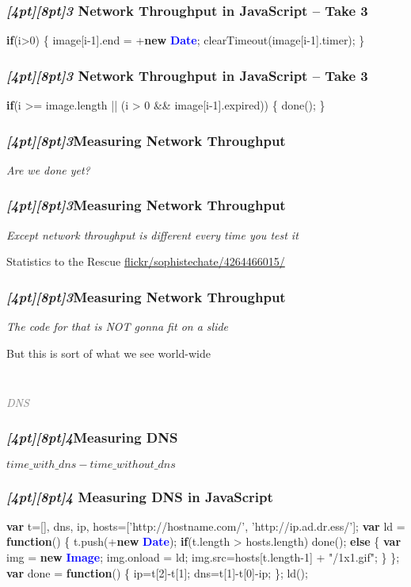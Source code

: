 \documentclass{beamer}
\newcommand{\sn}[1]{\textrm{\textit{\Huge{\raisebox{-3pt}[4pt][8pt]{\textcolor{f2elblue}{#1}}}}}\hspace{4pt}}
\newcommand{\innersplash}[1]{
  \begin{center}
    \large \textrm{\textit{ #1 } }
  \end{center}
}
\newcommand{\splashslide}[2][{}]{
  \begin{frame}
  \frametitle{#1}
  \innersplash{#2}
  \end{frame}
}
\newcommand{\leadinslide}[2]{
  \splashslide{
     {\fontsize{150}{20}\selectfont{\raisebox{0pt}[90pt][0pt]{\textcolor{light-gray}{#1}}}} \\ \huge \textcolor{gray}{#2}
  }
}
\def\green<#1>#2{\textcolor<#1>{dark-green}{\textbf<#1>{#2}}}
\def\blue<#1>#2{\textcolor<#1>{blue}{\textbf<#1>{#2}}}
\begin{document}
\begin{frame}[fragile]
\frametitle{\sn{3} Network Throughput in JavaScript -- Take 3}
\begin{semiverbatim}
\green<1>{if}(i>0) \{
   image[i-1].end = +\green<1>{new} \blue<1>{Date};
   clearTimeout(image[i-1].timer);
\}
\end{semiverbatim}
\end{frame}

\begin{frame}[fragile]
\frametitle{\sn{3} Network Throughput in JavaScript -- Take 3}
\begin{semiverbatim}
\green<1>{if}(i >= image.length
      || (i > 0 \&\& image[i-1].expired)) \{
   done();
\}
\end{semiverbatim}
\end{frame}

\splashslide[\sn{3}Measuring Network Throughput]{Are we done yet?\\ \only<2->{sure...}}

\splashslide[\sn{3}Measuring Network Throughput]{Except network throughput is different every time you test it}

\begin{frame}{Statistics to the Rescue}
\vspace{7.8cm}
\hspace{-1cm} \tiny \href{http://www.flickr.com/photos/sophistechate/4264466015/}{flickr/sophistechate/4264466015/}
\end{frame}

\splashslide[\sn{3}Measuring Network Throughput]{The code for that is NOT gonna fit on a slide}

\begin{frame}{But this is sort of what we see world-wide}
\end{frame}

\leadinslide{4}{DNS}

\splashslide[\sn{4}Measuring DNS]{ \( time\_with\_dns - time\_without\_dns \) }

\begin{frame}[fragile]
\frametitle{\sn{4} Measuring DNS in JavaScript}
\vspace{-.3cm}
\begin{semiverbatim}
\green<1>{var} t=[], dns, ip, hosts=['http://hostname.com/',
                          'http://ip.ad.dr.ess/'];
\green<1>{var} ld = \green<1>{function}() \{
   t.push(+\green<1>{new} \blue<1>{Date});
   \green<1>{if}(t.length > hosts.length) 
     done();
   \green<1>{else} \{
     \green<1>{var} img = \green<1>{new} \blue<1>{Image};
     img.onload = ld;
     img.src=hosts[t.length-1] + "/1x1.gif";
   \}
\};
\green<1>{var} done = \green<1>{function}() \{
  ip=t[2]-t[1];
  dns=t[1]-t[0]-ip;
\};
ld();
\end{semiverbatim}
\end{frame}
\end{document}
